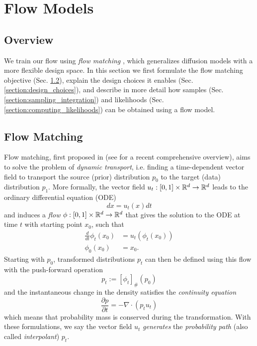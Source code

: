
\chapter{Flow Models}\label{section:flow_models}

\section{Overview}

We train our flow using \textit{flow matching} \citep{lipmanFlowMatchingGenerative2023,albergoStochasticInterpolantsUnifying2023,liuFlowStraightFast2022}, which generalizes diffusion models with a more flexible design space. In this section we first formulate the flow matching objective (Sec. \ref{section:flow_matching}), explain the design choices it enables (Sec. \ref{section:design_choices}), and describe in more detail how samples (Sec. \ref{section:sampling_integration}) and likelihoods (Sec. \ref{section:computing_likelihoods}) can be obtained using a flow model. 

\section{Flow Matching} \label{section:flow_matching}

Flow matching, first proposed in \citep{lipmanFlowMatchingGenerative2023,albergoStochasticInterpolantsUnifying2023,liuFlowStraightFast2022} (see \citep{lipmanFlowMatchingGuide2024} for a recent comprehensive overview), aims to solve the problem of \textit{dynamic transport}, i.e. finding a time-dependent vector field to transport the source (prior) distribution $p_0$ to the target (data) distribution $p_1$. More formally, the vector field $u_t: [0,1] \times \mathbb{R}^d \to \mathbb{R}^d$ leads to the ordinary differential equation (ODE)
\begin{equation} \label{eq:ode}
    dx = u_t(x) dt
\end{equation}
and induces a \textit{flow} $\phi: [0,1] \times \mathbb{R}^d \to \mathbb{R}^d$ that gives the solution to the ODE at time $t$ with starting point $x_0$, such that 
\begin{align}
    \frac{d}{dt} \phi_t(x_0) &= u_t(\phi_t(x_0)) \\
    \phi_0(x_0) &= x_0.
\end{align}
Starting with $p_0$, transformed distributions $p_t$ can then be defined using this flow with the push-forward operation
\begin{equation}
    p_t := [\phi_t]_\# (p_0)
\end{equation} 
and the instantaneous change in the density satisfies the \textit{continuity equation}
\begin{equation}
    \frac{\partial p}{\partial t} = - \nabla \cdot (p_t u_t)
\end{equation}
which means that probability mass is conserved during the transformation. With these formulations, we say the vector field $u_t$ \textit{generates} the \textit{probability path} (also called \textit{interpolant}) $p_t$.

